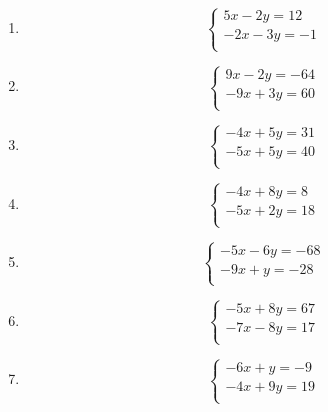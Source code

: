 \documentclass[24 pt]{article}
\begin{document}
\begin{enumerate}
\renewcommand{\labelenumi}{\alph{enumi})}
\item
\begin{equation*}
\begin{cases}
5x-2y=12\\
-2x-3y=-1\\
\end{cases}
\end{equation*}
\item
\begin{equation*}
\begin{cases}
9x-2y=-64\\
-9x+3y=60\\
\end{cases}
\end{equation*}
\item
\begin{equation*}
\begin{cases}
-4x+5y=31\\
-5x+5y=40\\
\end{cases}
\end{equation*}
\item
\begin{equation*}
\begin{cases}
-4x+8y=8\\
-5x+2y=18\\
\end{cases}
\end{equation*}
\item
\begin{equation*}
\begin{cases}
-5x-6y=-68\\
-9x+y=-28\\
\end{cases}
\end{equation*}
\item
\begin{equation*}
\begin{cases}
-5x+8y=67\\
-7x-8y=17\\
\end{cases}
\end{equation*}
\item
\begin{equation*}
\begin{cases}
-6x+y=-9\\
-4x+9y=19\\
\end{cases}

\end{equation*}
\end{enumerate}
\end{document}
